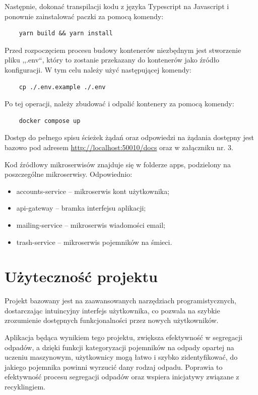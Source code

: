 \documentclass[12pt, a4paper, twoside, openany]{book}
\newcommand{\forceindent}{\leavevmode{\parindent=1.3em\indent}}
\begin{document}
Następnie, dokonać transpilacji kodu z języka Typescript na Javascript i ponownie zainstalować paczki za pomocą komendy:
\begin{lstlisting}
    yarn build && yarn install
\end{lstlisting}

Przed rozpoczęciem procesu budowy kontenerów niezbędnym jest stworzenie pliku ,,.env``, który to zostanie przekazany do kontenerów jako źródło konfiguracji. W tym celu należy użyć następującej komendy:
\begin{lstlisting}
    cp ./.env.example ./.env
\end{lstlisting}

Po tej operacji, należy zbudować i odpalić kontenery za pomocą komendy:
\begin{lstlisting}
    docker compose up
\end{lstlisting}

Dostęp do pełnego spisu ścieżek żądań oraz odpowiedzi na żądania dostępny jest bazowo pod adresem \url{http://localhost:50010/docs} oraz w załączniku nr. 3.

Kod źródłowy mikroserwisów znajduje się w folderze apps, podzielony na poszczególne mikroserwisy. Odpowiednio:
\begin{itemize}
    \item accounts-service -- mikroserwis kont użytkownika;
    \item api-gateway -- bramka interfejsu aplikacji;
    \item mailing-service -- mikroserwis wiadomości email;
    \item trash-service -- mikroserwis pojemników na śmieci.
\end{itemize}

\section{Użyteczność projektu}

\forceindent Projekt \topic bazowany jest na zaawansowanych narzędziach programistycznych, dostarczając intuincyjny interfejs użytkownika, co pozwala na szybkie zrozumienie dostępnych funkcjonalności przez nowych użytkowników.

Aplikacja będąca wynikiem tego projektu, zwiększa efektywność w segregacji odpadów, a dzięki funkcji kategoryzacji pojemników na odpady opartej na uczeniu maszynowym, użytkownicy mogą łatwo i szybko zidentyfikować, do jakiego pojemnika powinni wyrzucić dany rodzaj odpadu. Poprawia to efektywność procesu segregacji odpadów oraz wspiera inicjatywy związane z recyklingiem.
\end{document}
